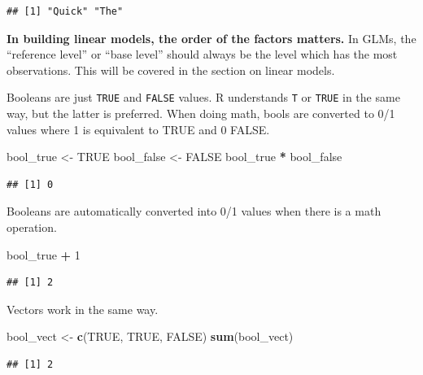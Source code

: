 \documentclass[openany]{book}
\newenvironment{Shaded}{\begin{snugshade}}{\end{snugshade}}
\newcommand{\DecValTok}[1]{\textcolor[rgb]{0.00,0.00,0.81}{#1}}
\newcommand{\KeywordTok}[1]{\textcolor[rgb]{0.13,0.29,0.53}{\textbf{#1}}}
\newcommand{\NormalTok}[1]{#1}
\newcommand{\OperatorTok}[1]{\textcolor[rgb]{0.81,0.36,0.00}{\textbf{#1}}}
\newcommand{\OtherTok}[1]{\textcolor[rgb]{0.56,0.35,0.01}{#1}}
\newcommand{\StringTok}[1]{\textcolor[rgb]{0.31,0.60,0.02}{#1}}
\begin{document}
\begin{verbatim}
## [1] "Quick" "The"
\end{verbatim}

\textbf{In building linear models, the order of the factors matters.} In GLMs, the
``reference level'' or ``base level'' should always be the level which has the most
observations. This will be covered in the section on linear models.

Booleans are just \texttt{TRUE} and \texttt{FALSE} values. R understands \texttt{T} or \texttt{TRUE} in the
same way, but the latter is preferred. When doing math, bools are converted to
0/1 values where 1 is equivalent to TRUE and 0 FALSE.

\begin{Shaded}
\begin{Highlighting}[]
\NormalTok{bool_true <-}\StringTok{ }\OtherTok{TRUE}
\NormalTok{bool_false <-}\StringTok{ }\OtherTok{FALSE}
\NormalTok{bool_true }\OperatorTok{*}\StringTok{ }\NormalTok{bool_false}
\end{Highlighting}
\end{Shaded}

\begin{verbatim}
## [1] 0
\end{verbatim}

Booleans are automatically converted into 0/1 values when there is a math operation.

\begin{Shaded}
\begin{Highlighting}[]
\NormalTok{bool_true }\OperatorTok{+}\StringTok{ }\DecValTok{1}
\end{Highlighting}
\end{Shaded}

\begin{verbatim}
## [1] 2
\end{verbatim}

Vectors work in the same way.

\begin{Shaded}
\begin{Highlighting}[]
\NormalTok{bool_vect <-}\StringTok{ }\KeywordTok{c}\NormalTok{(}\OtherTok{TRUE}\NormalTok{, }\OtherTok{TRUE}\NormalTok{, }\OtherTok{FALSE}\NormalTok{)}
\KeywordTok{sum}\NormalTok{(bool_vect)}
\end{Highlighting}
\end{Shaded}

\begin{verbatim}
## [1] 2
\end{verbatim}
\end{document}

